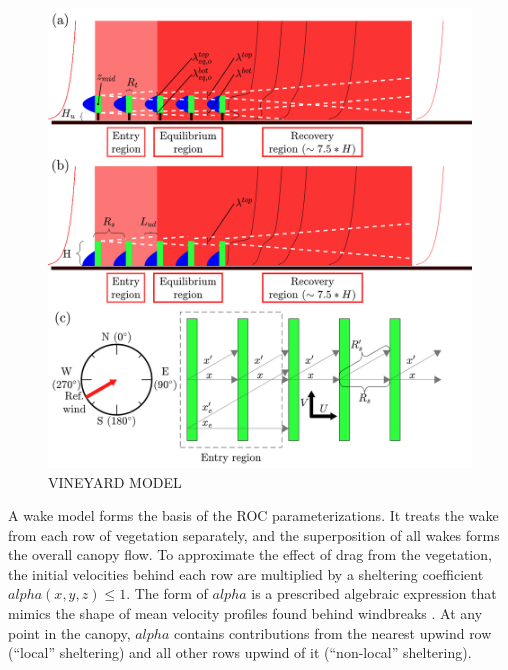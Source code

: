 \begin{figure}[H]\label{fig:ROCmodel}
    \centering 
    \includegraphics[width=\textwidth]{Images/ROC_model_schematic.png} 
    \caption{VINEYARD MODEL}
\end{figure}

A wake model forms the basis of the ROC parameterizations. It treats the wake from each row of vegetation separately, and the superposition of all wakes forms the overall canopy flow. To approximate the effect of drag from the vegetation, the initial velocities behind each row are multiplied by a sheltering coefficient $alpha(x,y,z) \leq 1$. The form of $alpha$ is a prescribed algebraic expression that mimics the shape of mean velocity profiles found behind windbreaks \cite{speckart2014}. At any point in the canopy, $alpha$ contains contributions from the nearest upwind row (``local'' sheltering) and all other rows upwind of it (``non-local'' sheltering).

